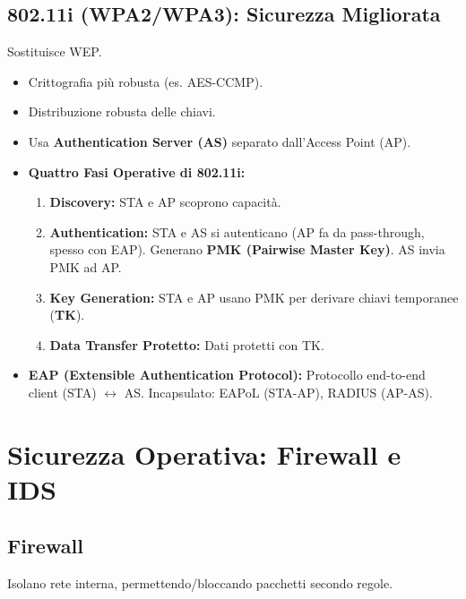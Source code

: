 \documentclass{article}
\begin{document}
\begin{enumerate}
\subsection{802.11i (WPA2/WPA3): Sicurezza Migliorata}
Sostituisce WEP.
\begin{itemize}
    \item Crittografia più robusta (es. AES-CCMP).
    \item Distribuzione robusta delle chiavi.
    \item Usa \textbf{Authentication Server (AS)} separato dall'Access Point (AP).
    \item \textbf{Quattro Fasi Operative di 802.11i:}
    \begin{enumerate}
        \item \textbf{Discovery:} STA e AP scoprono capacità.
        \item \textbf{Authentication:} STA e AS si autenticano (AP fa da pass-through, spesso con EAP). Generano \textbf{PMK (Pairwise Master Key)}. AS invia PMK ad AP.
        \item \textbf{Key Generation:} STA e AP usano PMK per derivare chiavi temporanee (\textbf{TK}).
        \item \textbf{Data Transfer Protetto:} Dati protetti con TK.
    \end{enumerate}
    \item \textbf{EAP (Extensible Authentication Protocol):} Protocollo end-to-end client (STA) $\leftrightarrow$ AS.
    Incapsulato: EAPoL (STA-AP), RADIUS (AP-AS).
\end{itemize}

\section{Sicurezza Operativa: Firewall e IDS}
\label{sec:firewall_ids}

\subsection{Firewall}
Isolano rete interna, permettendo/bloccando pacchetti secondo regole.

\begin{figure}[H]
    \centering
\end{figure}
\end{enumerate}
\end{document}
